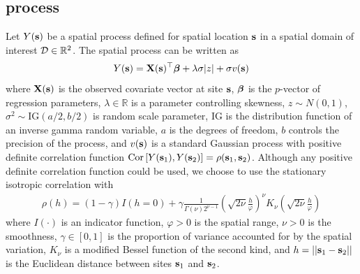 \subsection{\Skewt process} \label{sts:skewt}
Let $Y(\mathbf{s})$ be a spatial process defined for spatial location $\mathbf{s}$ in a spatial domain of interest ${\cal D} \in \mathbb{R}^2$.
The spatial \skewt process can be written as
\begin{align}
  Y(\mathbf{s}) = \mathbf{X}(\mathbf{s})^\top \mbox{\boldmath $\beta$} + \lambda \sigma |z| + \sigma v(\mathbf{s}) \label{steq:fullmodel}
\end{align}
where $\mathbf{X}(\mathbf{s})$ is the observed covariate vector at site $\mathbf{s}$, $\mbox{\boldmath $\beta$}$ is the $p$-vector of regression parameters, $\lambda \in \mathbb{R}$ is a parameter controlling skewness, $z \sim N(0, 1)$, $\sigma^2 \sim \text{IG}(a / 2, b / 2)$ is random scale parameter, IG is the distribution function of an inverse gamma random variable, $a$ is the degrees of freedom, $b$ controls the precision of the process, and $v(\mathbf{s})$ is a standard Gaussian process with positive definite correlation function $\text{Cor} \left[Y(\mathbf{s}_1), Y(\mathbf{s}_2)\right] = \rho(\mathbf{s}_1, \mathbf{s}_2)$.
Although any positive definite correlation function could be used, we choose to use the stationary isotropic \Matern correlation with
\begin{align}
  \rho(h) = (1 - \gamma) I(h = 0) + \gamma \frac{ 1 }{ \Gamma(\nu) 2^{ \nu - 1}} \left( \sqrt{2\nu} \frac{ h }{ \varphi } \right)^{\nu} K_{\nu} \left( \sqrt{2\nu} \frac{ h }{ \varphi } \right) \label{steq:matern}
\end{align}
where $I(\cdot)$ is an indicator function, $\varphi > 0$ is the spatial range, $\nu > 0$ is the smoothness, $\gamma \in [0, 1]$ is the proportion of variance accounted for by the spatial variation, $K_\nu$ is a modified Bessel function of the second kind, and $h = || \mathbf{s}_1 - \mathbf{s}_2 ||$ is the Euclidean distance between sites $\mathbf{s}_1$ and $\mathbf{s}_2$.

